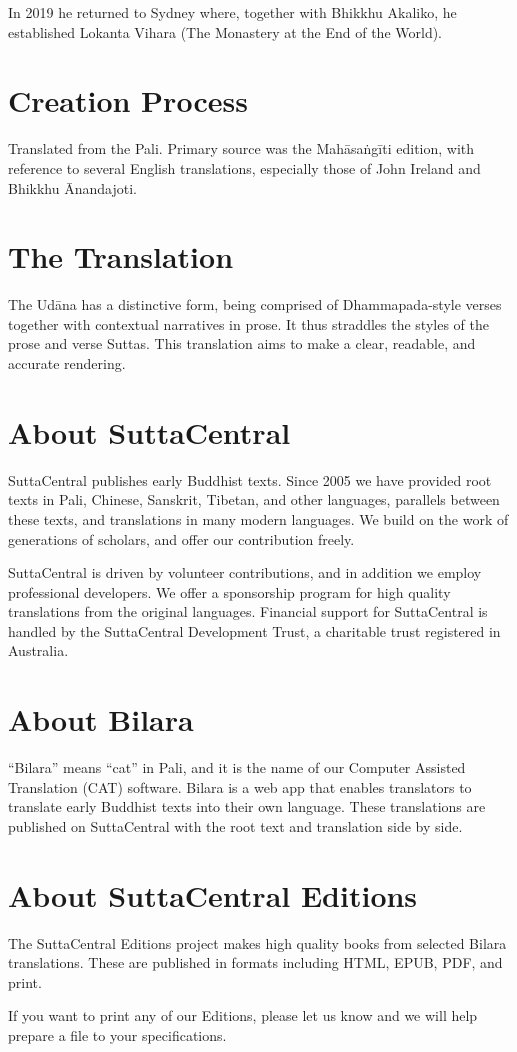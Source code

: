 \documentclass[12pt,openany]{book}%
\begin{document}
In 2019 he returned to Sydney where, together with Bhikkhu Akaliko, he established Lokanta Vihara (The Monastery at the End of the World). 

\section*{Creation Process}

Translated from the Pali. Primary source was the \textsanskrit{Mahāsaṅgīti} edition, with reference to several English translations, especially those of John Ireland and Bhikkhu Ānandajoti.

\section*{The Translation}

The \textsanskrit{Udāna} has a distinctive form, being comprised of Dhammapada-style verses together with contextual narratives in prose. It thus straddles the styles of the prose and verse Suttas. This translation aims to make a clear, readable, and accurate rendering.

\section*{About SuttaCentral}

SuttaCentral publishes early Buddhist texts. Since 2005 we have provided root texts in Pali, Chinese, Sanskrit, Tibetan, and other languages, parallels between these texts, and translations in many modern languages. We build on the work of generations of scholars, and offer our contribution freely.

SuttaCentral is driven by volunteer contributions, and in addition we employ professional developers. We offer a sponsorship program for high quality translations from the original languages. Financial support for SuttaCentral is handled by the SuttaCentral Development Trust, a charitable trust registered in Australia.

\section*{About Bilara}

“Bilara” means “cat” in Pali, and it is the name of our Computer Assisted Translation (CAT) software. Bilara is a web app that enables translators to translate early Buddhist texts into their own language. These translations are published on SuttaCentral with the root text and translation side by side.

\section*{About SuttaCentral Editions}

The SuttaCentral Editions project makes high quality books from selected Bilara translations. These are published in formats including HTML, EPUB, PDF, and print.

If you want to print any of our Editions, please let us know and we will help prepare a file to your specifications.

%
\end{document}

